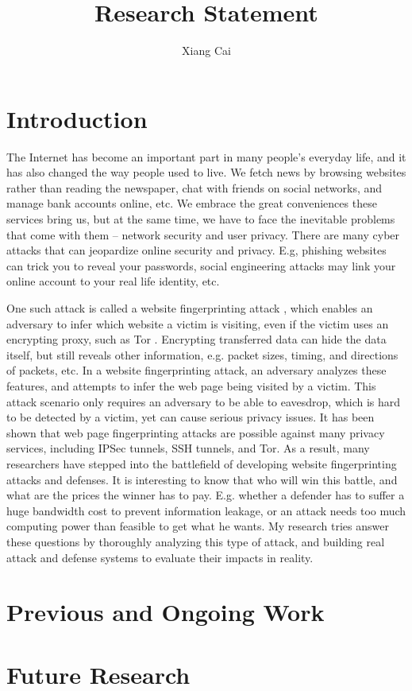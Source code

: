 \documentclass[11pt,oneside]{article}
\begin{document}
\title{Research Statement}
\author{Xiang Cai}
\maketitle

\section{Introduction}

The Internet has become an important part in many people's everyday life, and it has also changed the way people used to live. We fetch news by browsing websites rather than reading the newspaper, chat with friends on social networks, and manage bank accounts online, etc. We embrace the great conveniences these services bring us, but at the same time, we have to face the inevitable problems that come with them -- network security and user privacy. There are many cyber attacks that can jeopardize online security and privacy. E.g, phishing websites can trick you to reveal your passwords, social engineering attacks may link your online account to your real life identity, etc.

One such attack is called a website fingerprinting attack \cite{hintz-pets02}, which enables an adversary to infer which website a victim is visiting, even if the victim uses an encrypting proxy, such as Tor \cite{tor-website}. Encrypting transferred data can hide the data itself, but still reveals other information, e.g. packet sizes, timing, and directions of packets, etc. In a website fingerprinting attack, an adversary analyzes these features, and attempts to infer the web page being visited by a victim. This attack scenario only requires an adversary to be able to eavesdrop, which is hard to be detected by a victim, yet can cause serious privacy issues. It has been shown that web page fingerprinting attacks are possible against many privacy services, including IPSec tunnels, SSH tunnels, and Tor. As a result, many researchers have stepped into the battlefield of developing website fingerprinting attacks and defenses. It is interesting to know that who will win this battle, and what are the prices the winner has to pay. E.g. whether a defender has to suffer a huge bandwidth cost to prevent information leakage, or an attack needs too much computing power than feasible to get what he wants. My research tries answer these questions by thoroughly analyzing this type of attack, and building real attack and defense systems to evaluate their impacts in reality.

\section{Previous and Ongoing Work}



\section{Future Research}




\end{document}
